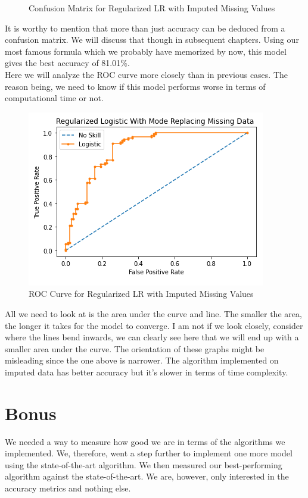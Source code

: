 \begin{itemize}
\begin{figure}[H]
\begin{center}
        \end{center}
        \caption{Confusion Matrix for Regularized LR with Imputed Missing Values}
    \end{figure}
    It is worthy to mention that more than just accuracy can be deduced from a confusion matrix. We will discuss that though in subsequent chapters. Using our most famous formula which we probably have memorized by now, this model gives the best accuracy of 81.01\%. 
    \\
    Here we will analyze the ROC curve more closely than in previous cases. The reason being, we need to know if this model performs worse in terms of computational time or not.
    \begin{figure}[H]
        \begin{center}
            \includegraphics[scale=0.6]{Images/RR_ROC.png}
        \end{center}
        \caption{ROC Curve for Regularized LR with Imputed Missing Values}
    \end{figure}
    All we need to look at is the area under the curve and line. The smaller the area, the longer it takes for the model to converge. I am not if we look closely, consider where the lines bend inwards, we can clearly see here that we will end up with a smaller area under the curve. The orientation of these graphs might be misleading since the one above is narrower. The algorithm implemented on imputed data has better accuracy but it's slower in terms of time complexity. 
\end{itemize}

\section{Bonus}
We needed a way to measure how good we are in terms of the algorithms we implemented. We, therefore, went a step further to implement one more model using the state-of-the-art algorithm. We then measured our best-performing algorithm against the state-of-the-art. We are, however, only interested in the accuracy metrics and nothing else.
\newpage
